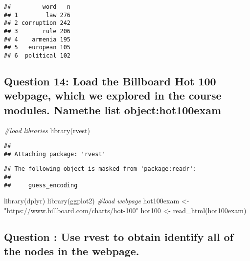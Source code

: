 \documentclass[
]{article}
\newenvironment{Shaded}{\begin{snugshade}}{\end{snugshade}}
\newcommand{\CommentTok}[1]{\textcolor[rgb]{0.56,0.35,0.01}{\textit{#1}}}
\newcommand{\FunctionTok}[1]{\textcolor[rgb]{0.00,0.00,0.00}{#1}}
\newcommand{\NormalTok}[1]{#1}
\newcommand{\OtherTok}[1]{\textcolor[rgb]{0.56,0.35,0.01}{#1}}
\newcommand{\StringTok}[1]{\textcolor[rgb]{0.31,0.60,0.02}{#1}}
\begin{document}
\begin{verbatim}
##         word   n
## 1        law 276
## 2 corruption 242
## 3       rule 206
## 4    armenia 195
## 5   european 105
## 6  political 102
\end{verbatim}

\hypertarget{question-14-load-the-billboard-hot-100-webpage-which-we-explored-in-the-course-modules.-namethe-list-objecthot100exam}{%
\subsection{Question 14: Load the Billboard Hot 100 webpage, which we
explored in the course modules. Namethe list
object:hot100exam}\label{question-14-load-the-billboard-hot-100-webpage-which-we-explored-in-the-course-modules.-namethe-list-objecthot100exam}}

\begin{Shaded}
\begin{Highlighting}[]
\CommentTok{\#load libraries}
\FunctionTok{library}\NormalTok{(rvest)}
\end{Highlighting}
\end{Shaded}

\begin{verbatim}
## 
## Attaching package: 'rvest'
\end{verbatim}

\begin{verbatim}
## The following object is masked from 'package:readr':
## 
##     guess_encoding
\end{verbatim}

\begin{Shaded}
\begin{Highlighting}[]
\FunctionTok{library}\NormalTok{(dplyr)}
\FunctionTok{library}\NormalTok{(ggplot2)}
\CommentTok{\#load webpage}
\NormalTok{hot100exam }\OtherTok{\textless{}{-}} \StringTok{"https://www.billboard.com/charts/hot{-}100"}
\NormalTok{hot100 }\OtherTok{\textless{}{-}} \FunctionTok{read\_html}\NormalTok{(hot100exam)}
\end{Highlighting}
\end{Shaded}

\hypertarget{question-use-rvest-to-obtain-identify-all-of-the-nodes-in-the-webpage.}{%
\subsection{Question : Use rvest to obtain identify all of the nodes in
the
webpage.}\label{question-use-rvest-to-obtain-identify-all-of-the-nodes-in-the-webpage.}}
\end{document}
